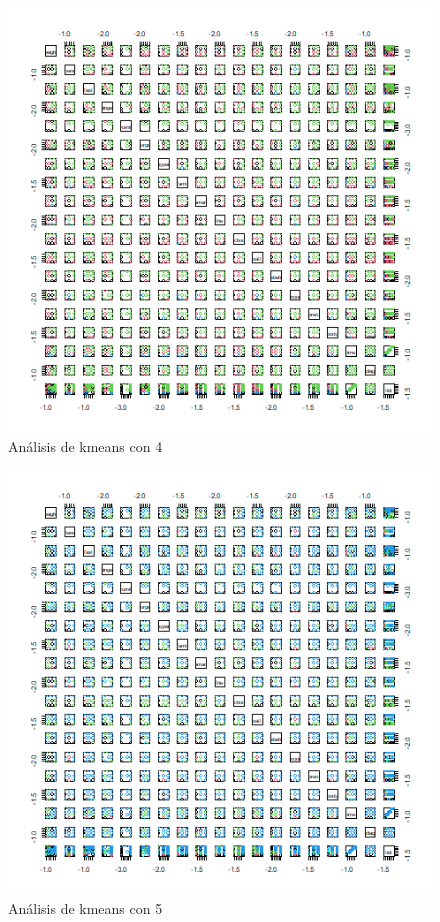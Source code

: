 \documentclass[a4paper,10pt,twocolumn]{article}
\begin{document}
	\begin{figure}[htb]%
		\begin{center}
			\includegraphics[width=\linewidth]{kmeans_cluster_4}
		\end{center}
		\caption{Análisis de kmeans con 4 \label{fig:kmeans_cluster_4}}%
	\end{figure}
	
	\begin{figure}[htb]%
		\begin{center}
			\includegraphics[width=\linewidth]{kmeans_cluster_5}
		\end{center}
		\caption{Análisis de kmeans con 5 \label{fig:kmeans_cluster_5}}%
	\end{figure}
	
\end{document}
